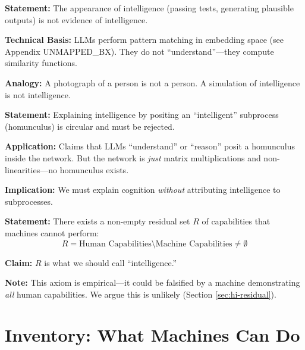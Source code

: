 \begin{tcolorbox}[colback=gray!5!white, colframe=gray!75!black,
    title=Axiom UNMAPPED_HI-3: Appearance Is Not Reality]
\textbf{Statement:} The appearance of intelligence (passing tests, generating plausible outputs) is not evidence of intelligence.

\textbf{Technical Basis:} LLMs perform pattern matching in embedding space (see Appendix UNMAPPED_BX). They do not ``understand''---they compute similarity functions.

\textbf{Analogy:} A photograph of a person is not a person. A simulation of intelligence is not intelligence.
\end{tcolorbox}

\begin{tcolorbox}[colback=gray!5!white, colframe=gray!75!black,
    title=Axiom UNMAPPED_HI-4: The Homunculus Trap]
\textbf{Statement:} Explaining intelligence by positing an ``intelligent'' subprocess (homunculus) is circular and must be rejected.

\textbf{Application:} Claims that LLMs ``understand'' or ``reason'' posit a homunculus inside the network. But the network is \textit{just} matrix multiplications and non-linearities---no homunculus exists.

\textbf{Implication:} We must explain cognition \textit{without} attributing intelligence to subprocesses.
\end{tcolorbox}

\begin{tcolorbox}[colback=gray!5!white, colframe=gray!75!black,
    title=Axiom UNMAPPED_HI-5: The Residual Exists]
\textbf{Statement:} There exists a non-empty residual set $R$ of capabilities that machines cannot perform:
\begin{equation}
R = \text{Human Capabilities} \setminus \text{Machine Capabilities} \neq \emptyset
\end{equation}

\textbf{Claim:} $R$ is what we should call ``intelligence.''

\textbf{Note:} This axiom is empirical---it could be falsified by a machine demonstrating \textit{all} human capabilities. We argue this is unlikely (Section \ref{sec:hi-residual}).
\end{tcolorbox}


\section{Inventory: What Machines Can Do}
\label{sec:hi-inventory}

